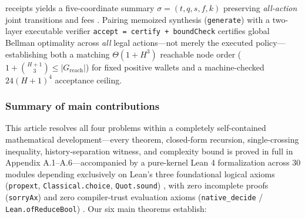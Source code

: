 \documentclass[11pt,a4paper]{article}
\begin{document}
\begin{enumerate}
  receipts yields a five-coordinate summary \(\sigma = (t, q, s, f, k)\)
  preserving \emph{all-action} joint transitions and fees
  \citep{halmosSavage1949, striebel1965, hinderer1970, subramanian2022}.
  Pairing memoized synthesis (\texttt{generate})
  \citep{bryant1986, bahar1997, hoey1999} with a two-layer executable
  verifier \texttt{accept\ =\ certify\ +\ boundCheck}
  \citep{blumKannan1995, mcconnell2011, nipkowPaulsonWenzel2002, bertotCasteran2004, hoelzl2017, mouraUllrich2021, schaeffelerAbdulaziz2023}
  certifies global Bellman optimality across \emph{all} legal
  actions---not merely the executed policy---establishing both a
  matching \(\Theta(1 + H^3)\) reachable node order
  (\(1 + \binom{H+1}{3} \le |G_{\mathrm{reach}}|\)) for fixed positive
  wallets and a machine-checked \(24(H+1)^4\) acceptance ceiling.
\end{enumerate}

\subsubsection{Summary of main
contributions}\label{summary-of-main-contributions}

This article resolves all four problems within a completely
self-contained mathematical development---every theorem, closed-form
recursion, single-crossing inequality, history-separation witness, and
complexity bound is proved in full in Appendix A.1--A.6---accompanied by
a pure-kernel Lean 4 formalization \citep{mouraUllrich2021, mathlib2020}
across 30 modules depending exclusively on Lean's three foundational
logical axioms (\texttt{propext}, \texttt{Classical.choice},
\texttt{Quot.sound}) \citep{carneiro2019}, with zero incomplete proofs
(\texttt{sorryAx}) and zero compiler-trust evaluation axioms
(\texttt{native\_decide} / \texttt{Lean.ofReduceBool})
\citep{boespflug2011, boutin1997}. Our six main theorems establish:
\end{document}
